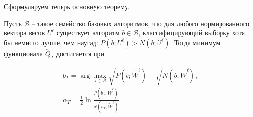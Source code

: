 Сформулируем теперь основную теорему.
\begin{theorem}
    Пусть $\mathscr{B}$ -- такое семейство базовых алгоритмов, что для любого нормированного вектора весов $U^{\ell}$ существует алгоритм $b \in \mathscr{B}$, классифицирующий выборку хотя бы немного лучше, чем наугад: $P\left(b ; U^{\ell}\right)>N\left(b ; U^{\ell}\right)$.
    Тогда минимум функционала $\widetilde{Q}_T$ достигается при

    \begin{equation*}
        \begin{aligned}
             & b_T=\arg \max _{b \in \mathscr{B}} \sqrt{P\left(b ; \widetilde{W}^{\ell}\right)}-\sqrt{N\left(b ; \widetilde{W}^{\ell}\right)}, \\
             & \alpha_T=\frac{1}{2} \ln \frac{P\left(b_T ; \widetilde{W}^{\ell}\right)}{N\left(b_T ; \widetilde{W}^{\ell}\right)}
        \end{aligned}
    \end{equation*}
\end{theorem}

